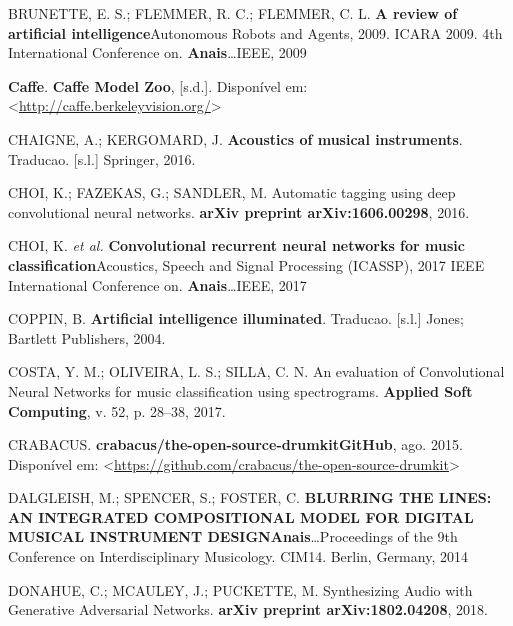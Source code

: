 \documentclass[]{article}
\begin{document}
\leavevmode\hypertarget{ref-brunette2009review}{}%
BRUNETTE, E. S.; FLEMMER, R. C.; FLEMMER, C. L. \textbf{A review of
artificial intelligence}Autonomous Robots and Agents, 2009. ICARA 2009.
4th International Conference on. \textbf{Anais}\ldots{}IEEE, 2009

\leavevmode\hypertarget{ref-caffe}{}%
\textbf{Caffe}. \textbf{Caffe \textbar{} Model Zoo}, {[}s.d.{]}.
Disponível em:
\textless{}\url{http://caffe.berkeleyvision.org/}\textgreater{}

\leavevmode\hypertarget{ref-chaigne2016acoustics}{}%
CHAIGNE, A.; KERGOMARD, J. \textbf{Acoustics of musical instruments}.
Traducao. {[}s.l.{]} Springer, 2016.

\leavevmode\hypertarget{ref-choi2016automatic}{}%
CHOI, K.; FAZEKAS, G.; SANDLER, M. Automatic tagging using deep
convolutional neural networks. \textbf{arXiv preprint arXiv:1606.00298},
2016.

\leavevmode\hypertarget{ref-choi2017convolutional}{}%
CHOI, K. \emph{et al.} \textbf{Convolutional recurrent neural networks
for music classification}Acoustics, Speech and Signal Processing
(ICASSP), 2017 IEEE International Conference on.
\textbf{Anais}\ldots{}IEEE, 2017

\leavevmode\hypertarget{ref-coppin2004artificial}{}%
COPPIN, B. \textbf{Artificial intelligence illuminated}. Traducao.
{[}s.l.{]} Jones; Bartlett Publishers, 2004.

\leavevmode\hypertarget{ref-costa2017evaluation}{}%
COSTA, Y. M.; OLIVEIRA, L. S.; SILLA, C. N. An evaluation of
Convolutional Neural Networks for music classification using
spectrograms. \textbf{Applied Soft Computing}, v. 52, p. 28--38, 2017.

\leavevmode\hypertarget{ref-crabacus_2015}{}%
CRABACUS. \textbf{crabacus/the-open-source-drumkit}\textbf{GitHub}, ago.
2015. Disponível em:
\textless{}\url{https://github.com/crabacus/the-open-source-drumkit}\textgreater{}

\leavevmode\hypertarget{ref-dalgleish2014blurring}{}%
DALGLEISH, M.; SPENCER, S.; FOSTER, C. \textbf{BLURRING THE LINES: AN
INTEGRATED COMPOSITIONAL MODEL FOR DIGITAL MUSICAL INSTRUMENT
DESIGN}\textbf{Anais}\ldots{}Proceedings of the 9th Conference on
Interdisciplinary Musicology. CIM14. Berlin, Germany, 2014

\leavevmode\hypertarget{ref-donahue2018synthesizing}{}%
DONAHUE, C.; MCAULEY, J.; PUCKETTE, M. Synthesizing Audio with
Generative Adversarial Networks. \textbf{arXiv preprint
arXiv:1802.04208}, 2018.
\end{document}
